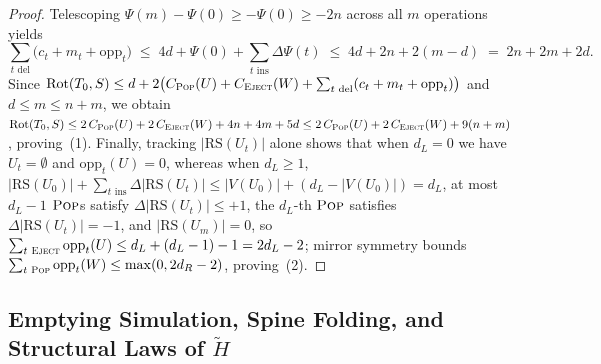 \documentclass[11pt]{article}
\theoremstyle{definition}
\theoremstyle{remark}
\newcommand{\RS}{\mathrm{RS}}
\newcommand{\Rot}{\mathrm{Rot}}
\newcommand{\POP}{\textnormal{\scshape Pop}}
\newcommand{\EJECT}{\textnormal{\scshape Eject}}
\begin{document}
\begin{proof}
Telescoping $\Psi(m) - \Psi(0) \ge -\Psi(0) \ge -2n$ across all $m$ operations yields
\[
\sum_{t\text{ del}} \big(c_t + m_t + \mathrm{opp}_t\big)
\;\le\; 4d + \Psi(0) + \sum_{t\text{ ins}} \Delta\Psi(t)
\;\le\; 4d + 2n + 2(m - d) \;=\; 2n + 2m + 2d.
\]
Since $\Rot(T_0, S) \le d + 2\big(C_{\POP}(U) + C_{\EJECT}(W) + \sum_{t\text{ del}}(c_t + m_t + \mathrm{opp}_t)\big)$ and $d \le m \le n + m$, we obtain $\Rot(T_0, S) \le 2\,C_{\POP}(U) + 2\,C_{\EJECT}(W) + 4n + 4m + 5d \le 2\,C_{\POP}(U) + 2\,C_{\EJECT}(W) + 9(n + m)$, proving~(1). Finally, tracking $|\RS(U_t)|$ alone shows that when $d_L = 0$ we have $U_t = \emptyset$ and $\mathrm{opp}_t(U) = 0$, whereas when $d_L \ge 1$, $|\RS(U_0)| + \sum_{t\text{ ins}} \Delta|\RS(U_t)| \le |V(U_0)| + (d_L - |V(U_0)|) = d_L$, at most $d_L - 1$ $\POP$s satisfy $\Delta|\RS(U_t)| \le +1$, the $d_L$-th $\POP$ satisfies $\Delta|\RS(U_t)| = -1$, and $|\RS(U_m)| = 0$, so $\sum_{t\text{ }\EJECT} \mathrm{opp}_t(U) \le d_L + (d_L - 1) - 1 = 2d_L - 2$; mirror symmetry bounds $\sum_{t\text{ }\POP} \mathrm{opp}_t(W) \le \max(0, 2d_R - 2)$, proving~(2).
\end{proof}


\subsection{Emptying Simulation, Spine Folding, and Structural Laws of \texorpdfstring{$\widetilde{H}$}{H-tilde}}
\label{subsec:folded-laws}
\end{document}
